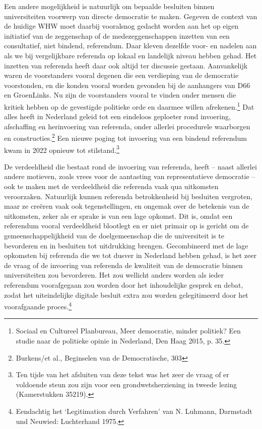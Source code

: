 \documentclass[empirical, authordate, ]{new-jote-article}
\begin{document}
	Een andere mogelijkheid is natuurlijk om bepaalde besluiten binnen universiteiten voorwerp van directe democratie te maken. Gegeven de context van de huidige WHW moet daarbij vooralsnog gedacht worden aan het op eigen initiatief van de zeggenschap of de medezeggenschappen inzetten van een consultatief, niet bindend, referendum. Daar kleven dezelfde voor- en nadelen aan als we bij vergelijkbare referenda op lokaal en landelijk niveau hebben gehad. Het inzetten van referenda heeft daar ook altijd ter discussie gestaan. Aanvankelijk waren de voorstanders vooral degenen die een verdieping van de democratie voorstonden, en die konden vooral worden gevonden bij de aanhangers van D66 en GroenLinks. Nu zijn de voorstanders vooral te vinden onder mensen die kritiek hebben op de gevestigde politieke orde en daarmee willen afrekenen.\footnote{Sociaal en Cultureel Planbureau, Meer democratie, minder politiek? Een studie naar de politieke opinie in Nederland, Den Haag 2015, p. 35. } Dat alles heeft in Nederland geleid tot een eindeloos geploeter rond invoering, afschaffing en herinvoering van referenda, onder allerlei procedurele waarborgen en constructies.\footnote{Burkens/et al., Beginselen van de Democratische, 303} Een nieuwe poging tot invoering van een bindend referendum kwam in 2022 opnieuw tot stilstand.\footnote{Ten tijde van het afsluiten van deze tekst was het zeer de vraag of er voldoende steun zou zijn voor een grondwetsherziening in tweede lezing (Kamerstukken 35219).}



	De verdeeldheid die bestaat rond de invoering van referenda, heeft -- naast allerlei andere motieven, zoals vrees voor de aantasting van representatieve democratie -- ook te maken met de verdeeldheid die referenda vaak qua uitkomsten veroorzaken. Natuurlijk kunnen referenda betrokkenheid bij besluiten vergroten, maar ze creëren vaak ook tegenstellingen, en ongemak over de betekenis van de uitkomsten, zeker als er sprake is van een lage opkomst. Dit is, omdat een referendum vooral verdeeldheid blootlegt en er niet primair op is gericht om de gemeenschappelijkheid van de doelgemeenschap die de universiteit is te bevorderen en in besluiten tot uitdrukking brengen. Gecombineerd met de lage opkomsten bij referenda die we tot dusver in Nederland hebben gehad, is het zeer de vraag of de invoering van referenda de kwaliteit van de democratie binnen universiteiten zou bevorderen. Het zou wellicht anders worden als ieder referendum voorafgegaan zou worden door het inhoudelijke gesprek en debat, zodat het uiteindelijke digitale besluit extra zou worden gelegitimeerd door het voorafgaande proces.\footnote{Eendachtig het ‘Legitimation durch Verfahren' van N. Luhmann, Darmstadt und Neuwied: Luchterhand 1975.}
\end{document}
